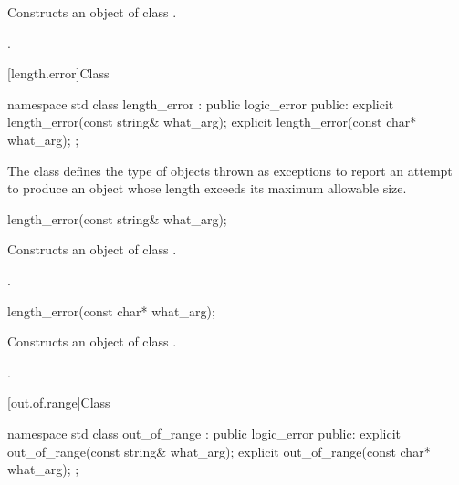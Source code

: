 \begin{itemdescr}
\pnum
\effects
Constructs an object of class
.

\pnum
\postconditions
{}.
\end{itemdescr}

[length.error]{Class }

%
\begin{codeblock}
namespace std {
  class length_error : public logic_error {
  public:
    explicit length_error(const string& what_arg);
    explicit length_error(const char* what_arg);
  };
}
\end{codeblock}

\pnum
The class
defines the type of objects thrown as exceptions
to report an attempt to produce
an object whose length exceeds its maximum allowable size.

%
\begin{itemdecl}
length_error(const string& what_arg);
\end{itemdecl}

\begin{itemdescr}
\pnum
\effects
Constructs an object of class
.

\pnum
\postconditions
{}.
\end{itemdescr}

%
\begin{itemdecl}
length_error(const char* what_arg);
\end{itemdecl}

\begin{itemdescr}
\pnum
\effects
Constructs an object of class
.

\pnum
\postconditions
{}.
\end{itemdescr}

[out.of.range]{Class }

%
\begin{codeblock}
namespace std {
  class out_of_range : public logic_error {
  public:
    explicit out_of_range(const string& what_arg);
    explicit out_of_range(const char* what_arg);
  };
}
\end{codeblock}

